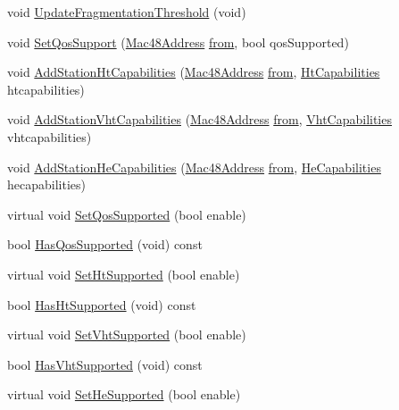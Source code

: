\begin{DoxyCompactItemize}
void \hyperlink{classns3_1_1WifiRemoteStationManager_a7418b5958ff90c62a88539443dfc90dc}{Update\+Fragmentation\+Threshold} (void)
\item 
void \hyperlink{classns3_1_1WifiRemoteStationManager_a8146d57b94ed85447d28a3f66e24d45b}{Set\+Qos\+Support} (\hyperlink{classns3_1_1Mac48Address}{Mac48\+Address} \hyperlink{lte__amc_8m_a1b4c81ff74eb1a626b5ade44c81004b3}{from}, bool qos\+Supported)
\item 
void \hyperlink{classns3_1_1WifiRemoteStationManager_ae78d843a98a66ff2d8584da8ed189b4d}{Add\+Station\+Ht\+Capabilities} (\hyperlink{classns3_1_1Mac48Address}{Mac48\+Address} \hyperlink{lte__amc_8m_a1b4c81ff74eb1a626b5ade44c81004b3}{from}, \hyperlink{classns3_1_1HtCapabilities}{Ht\+Capabilities} htcapabilities)
\item 
void \hyperlink{classns3_1_1WifiRemoteStationManager_a52b9e283f99e113cba95afbc2acea72b}{Add\+Station\+Vht\+Capabilities} (\hyperlink{classns3_1_1Mac48Address}{Mac48\+Address} \hyperlink{lte__amc_8m_a1b4c81ff74eb1a626b5ade44c81004b3}{from}, \hyperlink{classns3_1_1VhtCapabilities}{Vht\+Capabilities} vhtcapabilities)
\item 
void \hyperlink{classns3_1_1WifiRemoteStationManager_a948fccf8ed2cb0dcfaa73784ec35db8e}{Add\+Station\+He\+Capabilities} (\hyperlink{classns3_1_1Mac48Address}{Mac48\+Address} \hyperlink{lte__amc_8m_a1b4c81ff74eb1a626b5ade44c81004b3}{from}, \hyperlink{classns3_1_1HeCapabilities}{He\+Capabilities} hecapabilities)
\item 
virtual void \hyperlink{classns3_1_1WifiRemoteStationManager_a3a90437d829be37372bab95f303b3587}{Set\+Qos\+Supported} (bool enable)
\item 
bool \hyperlink{classns3_1_1WifiRemoteStationManager_a73d316dc89350027ec518bcc6fe21ec1}{Has\+Qos\+Supported} (void) const 
\item 
virtual void \hyperlink{classns3_1_1WifiRemoteStationManager_a9078e641b9b16f237974d07d37d88af9}{Set\+Ht\+Supported} (bool enable)
\item 
bool \hyperlink{classns3_1_1WifiRemoteStationManager_ac792dc8f3c77d507d25de0b87b52608c}{Has\+Ht\+Supported} (void) const 
\item 
virtual void \hyperlink{classns3_1_1WifiRemoteStationManager_a149cf907f831f80e22162624a01f6c1a}{Set\+Vht\+Supported} (bool enable)
\item 
bool \hyperlink{classns3_1_1WifiRemoteStationManager_afae2836c7785854272d73bf33e58c95a}{Has\+Vht\+Supported} (void) const 
\item 
virtual void \hyperlink{classns3_1_1WifiRemoteStationManager_a18c218db519ceb78e910b6184a4e2992}{Set\+He\+Supported} (bool enable)

\end{DoxyCompactItemize}
